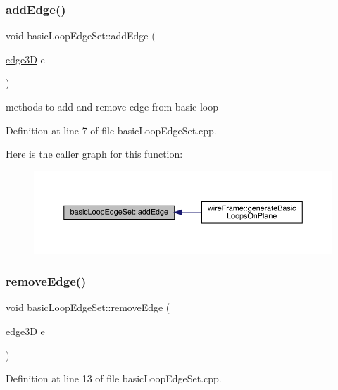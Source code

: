 \subsubsection{\texorpdfstring{add\+Edge()}{addEdge()}}
{\footnotesize\ttfamily void basic\+Loop\+Edge\+Set\+::add\+Edge (\begin{DoxyParamCaption}\item[{\mbox{\hyperlink{structedge3_d}{edge3D}}}]{e }\end{DoxyParamCaption})}

methods to add and remove edge from basic loop 

Definition at line 7 of file basic\+Loop\+Edge\+Set.\+cpp.

Here is the caller graph for this function\+:
\nopagebreak
\begin{figure}[H]
\begin{center}
\leavevmode
\includegraphics[width=350pt]{classbasic_loop_edge_set_a796243033ab3276548e7ff644705dddc_icgraph}
\end{center}
\end{figure}
\mbox{\label{classbasic_loop_edge_set_aa58522d2678542f6c50888944f7fea4b}} 
\subsubsection{\texorpdfstring{remove\+Edge()}{removeEdge()}}
{\footnotesize\ttfamily void basic\+Loop\+Edge\+Set\+::remove\+Edge (\begin{DoxyParamCaption}\item[{\mbox{\hyperlink{structedge3_d}{edge3D}}}]{e }\end{DoxyParamCaption})}



Definition at line 13 of file basic\+Loop\+Edge\+Set.\+cpp.

\mbox{\label{classbasic_loop_edge_set_addb31fe543f58c29b77205f724afb1af}} 
